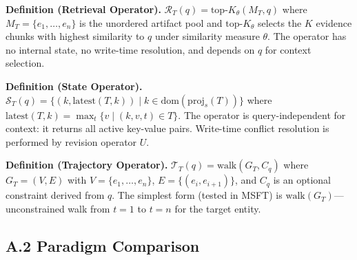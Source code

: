\documentclass[letterpaper,twocolumn,10pt]{article}
\begin{document}
\textbf{Definition (Retrieval Operator).} $\mathcal{R}_T(q) = \text{top-}K_\theta(M_T, q)$ where $M_T = \{e_1,\dots,e_n\}$ is the unordered artifact pool and $\text{top-}K_\theta$ selects the $K$ evidence chunks with highest similarity to $q$ under similarity measure $\theta$. The operator has no internal state, no write-time resolution, and depends on $q$ for context selection.

\textbf{Definition (State Operator).} $\mathcal{S}_T(q) = \{(k,\text{latest}(T,k)) \mid k\in\text{dom}(\mathrm{proj}_s(T))\}$ where $\text{latest}(T,k) = \max_t\{v \mid (k,v,t)\in T\}$. The operator is query-independent for context: it returns all active key-value pairs. Write-time conflict resolution is performed by revision operator $U$.

\textbf{Definition (Trajectory Operator).} $\mathcal{T}_T(q) = \text{walk}(G_T, C_q)$ where $G_T = (V,E)$ with $V = \{e_1,\dots,e_n\}$, $E = \{(e_i,e_{i+1})\}$, and $C_q$ is an optional constraint derived from $q$. The simplest form (tested in MSFT) is $\text{walk}(G_T)$---unconstrained walk from $t=1$ to $t=n$ for the target entity.

\subsection*{A.2 Paradigm Comparison}
\begin{table}[h]
\centering
{}
\end{table}
\end{document}
